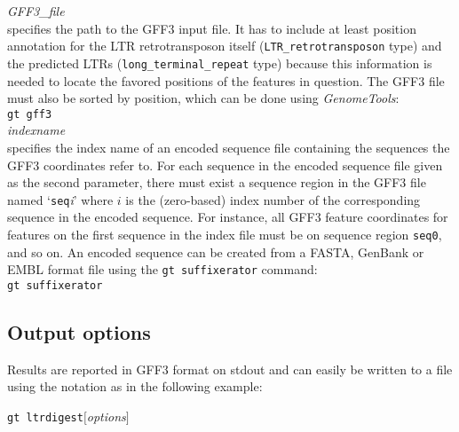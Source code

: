 \documentclass[12pt,titlepage]{article}
\newcommand{\GenomeTools}{\textit{GenomeTools}\xspace}
\newcommand{\GtLTRdigest}{\texttt{gt ltrdigest}\xspace}
\newcommand{\Gtsuffixerator}{\texttt{gt suffixerator}\xspace}
\begin{document}
\emph{GFF3\_file}\\ specifies the path to the GFF3 input file. It has to include at least position annotation for the LTR retrotransposon itself (\texttt{LTR\_retrotransposon} type) and the predicted LTRs (\texttt{long\_terminal\_repeat} type) because this information is needed to locate the favored positions of the features in question. The GFF3 file must also be sorted by position, which can be done using \GenomeTools :\\
\texttt{gt gff3}   \texttt{} \\

\emph{indexname}\\ specifies the index name of an encoded sequence file containing the sequences the GFF3 coordinates refer to. For each sequence in the encoded sequence file given as the second parameter, there must exist a sequence region in the GFF3 file named `\texttt{seq}\textit{i}' where $i$ is the (zero-based) index number of the corresponding sequence in the encoded sequence. For instance, all GFF3 feature coordinates for features on the first sequence in the index file must be on sequence region \texttt{seq0}, and so on. An encoded sequence can be created from a FASTA, GenBank or EMBL format file using the \Gtsuffixerator command:\\
\Gtsuffixerator {}       

\subsection{Output options}

Results are reported in GFF3 format on stdout and can easily
be written to a file using the notation \texttt{}
 as in the following example:

\GtLTRdigest $[$\emph{options}$]$   \texttt{} 
\end{document}
